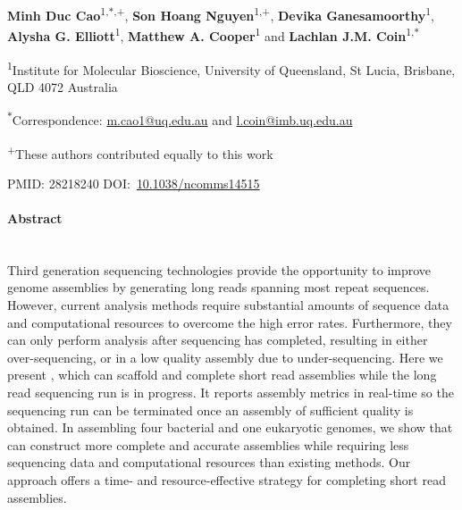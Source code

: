\clearpage
\thispagestyle{empty}
\vskip36pt
{\raggedright\sffamily\bfseries\fontsize{20}{25}\selectfont {Scaffolding and completing genome assemblies in real-time with nanopore sequencing}\par}
\vskip20pt
{\raggedright\sffamily\fontsize{12}{12} {
\textbf{Minh Duc Cao}\textsuperscript{1,$\ast$,+},
\textbf{Son Hoang Nguyen}\textsuperscript{1,+},
\textbf{Devika Ganesamoorthy}\textsuperscript{1},
\textbf{Alysha G. Elliott}\textsuperscript{1},
\textbf{Matthew A.  Cooper}\textsuperscript{1} and
\textbf{Lachlan J.M. Coin}\textsuperscript{1,$\ast$}
}\par}
\vskip10pt
{\raggedright\sffamily\fontsize{10}{12} {
\textsuperscript{1}Institute for Molecular Bioscience, University of Queensland, 
St Lucia, Brisbane, QLD 4072 Australia \par
\textsuperscript{$\ast$}Correspondence: \href{m.cao1@uq.edu.au}{m.cao1@uq.edu.au} and \href{l.coin@imb.uq.edu.au}{l.coin@imb.uq.edu.au} \par 
\textsuperscript{+}These authors contributed equally to this work
}\par}
\vskip10pt
{\raggedright\sffamily\fontsize{12}{16}\selectfont  {Received 11 Jul 2016. Accepted 6 Jan 2017. Published 20 Feb 2017}\par}
\vskip10pt
{\raggedright\sffamily\fontsize{12}{16}\selectfont  
PMID: 28218240 \hskip15pt DOI:~\href{https://doi.org/10.1038/ncomms14515}{10.1038/ncomms14515}\par}
\vskip10pt
\paragraph{Abstract}\mbox{}\\
Third generation sequencing technologies provide the opportunity to improve
genome assemblies by generating long reads spanning most repeat sequences. 
However, current analysis methods require substantial amounts of sequence data and
computational resources to overcome the high error rates. Furthermore, they can
only perform analysis after sequencing has completed, resulting in
either over-sequencing, or in a low quality assembly due to under-sequencing. Here we
present \npscarf{}, which can scaffold and complete short read assemblies while the
long read sequencing run is in progress. It reports assembly metrics in real-time so
the sequencing run can be terminated once an assembly of sufficient quality is
obtained. In assembling four bacterial and one eukaryotic genomes, we show that
\npscarf{} can construct more complete and accurate assemblies while requiring less
sequencing data and computational resources than existing methods. Our approach
offers a time- and resource-effective strategy for completing short read
assemblies.
\clearpage
\pagebreak

